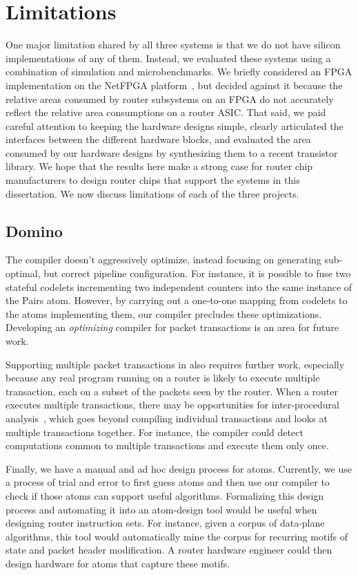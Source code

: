 \chapter{Limitations}
\label{chap:limitations}

One major limitation shared by all three systems is that we do not have silicon
implementations of any of them. Instead, we evaluated these systems using a
combination of simulation and microbenchmarks. We briefly considered an FPGA
implementation on the NetFPGA platform~\cite{netfpga}, but decided against it
because the relative areas consumed by router subsystems on an FPGA do not
accurately reflect the relative area consumptions on a router ASIC.  That said,
we paid careful attention to keeping the hardware designs simple, clearly
articulated the interfaces between the different hardware blocks, and evaluated
the area consumed by our hardware designs by synthesizing them to a recent
transistor library. We hope that the results here make a strong case for router
chip manufacturers to design router chips that support the systems in this
dissertation. We now discuss limitations of each of the three projects.

\section{Domino}
\label{sec:domino_limitations}
The \pktlanguage compiler doesn't aggressively optimize, instead focusing on
generating sub-optimal, but correct pipeline configuration. For instance, it is
possible to fuse two stateful codelets incrementing two independent counters
into the same instance of the Pairs atom. However, by carrying out a one-to-one
mapping from codelets to the atoms implementing them, our compiler precludes
these optimizations.  Developing an {\em optimizing} compiler for packet
transactions is an area for future work.

Supporting multiple packet transactions in \pktlanguage also requires further
work, especially because any real program running on a router is likely to
execute multiple transaction, each on a subset of the packets seen by the
router. When a router executes multiple transactions, there may be
opportunities for inter-procedural analysis~\cite{dragonbook}, which goes
beyond compiling individual transactions and looks at multiple transactions
together.  For instance, the compiler could detect computations common to
multiple transactions and execute them only once.

Finally, we have a manual and ad hoc design process for atoms. Currently, we
use a process of trial and error to first guess atoms and then use our compiler
to check if those atoms can support useful algorithms.  Formalizing this design
process and automating it into an atom-design tool would be useful when
designing router instruction sets. For instance, given a corpus of data-plane
algorithms, this tool would automatically mine the corpus for recurring motifs
of state and packet header modification. A router hardware engineer could then
design hardware for atoms that capture these motifs.

